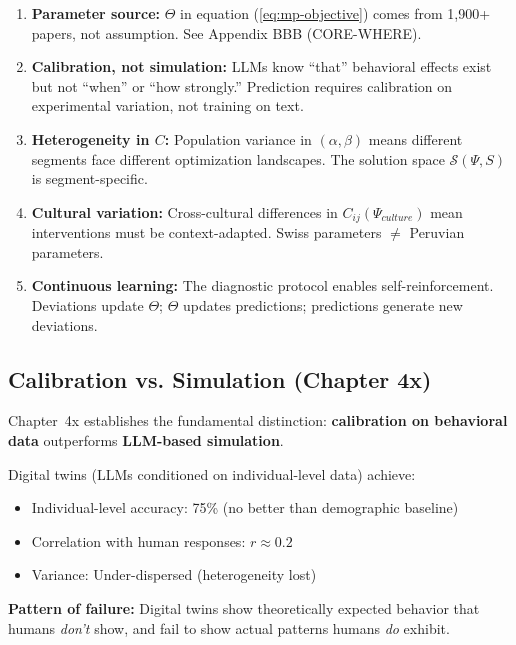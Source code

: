 \begin{enumerate}
\item \textbf{Parameter source:} $\Theta$ in equation (\ref{eq:mp-objective}) comes from
      1,900+ papers, not assumption. See Appendix BBB (CORE-WHERE).

\item \textbf{Calibration, not simulation:} LLMs know ``that'' behavioral effects exist
      but not ``when'' or ``how strongly.'' Prediction requires calibration on experimental
      variation, not training on text.

\item \textbf{Heterogeneity in $C$:} Population variance in $(\alpha, \beta)$ means
      different segments face different optimization landscapes. The solution space
      $\mathcal{S}(\Psi, S)$ is segment-specific.

\item \textbf{Cultural variation:} Cross-cultural differences in $C_{ij}(\Psi_{culture})$
      mean interventions must be context-adapted. Swiss parameters $\neq$ Peruvian parameters.

\item \textbf{Continuous learning:} The diagnostic protocol enables self-reinforcement.
      Deviations update $\Theta$; $\Theta$ updates predictions; predictions generate new deviations.
\end{enumerate}

\subsection{Calibration vs. Simulation (Chapter 4x)}

Chapter~4x establishes the fundamental distinction: \textbf{calibration on behavioral data}
outperforms \textbf{LLM-based simulation}.

\begin{tcolorbox}[colback=red!5!white, colframe=red!75!black,
    title=\textbf{The Peng et al. Finding (2025)}]

Digital twins (LLMs conditioned on individual-level data) achieve:
\begin{itemize}
\item Individual-level accuracy: 75\% (no better than demographic baseline)
\item Correlation with human responses: $r \approx 0.2$
\item Variance: Under-dispersed (heterogeneity lost)
\end{itemize}

\textbf{Pattern of failure:} Digital twins show theoretically expected behavior that
humans \textit{don't} show, and fail to show actual patterns humans \textit{do} exhibit.

\end{tcolorbox}

